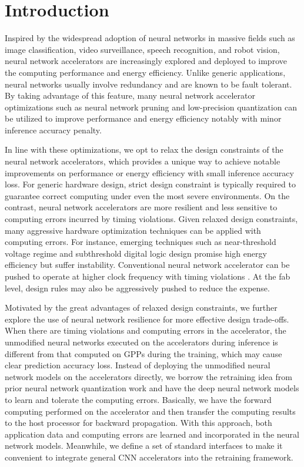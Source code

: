 \section{Introduction} \label{sec:intro}
Inspired by the widespread adoption of neural networks in massive fields such as image classification, 
video surveillance, speech recognition, and robot vision, neural network accelerators 
\cite{pipecnn_2,Zhang2015_9,Qiu2016_10,deepburing_12,Farabet2010_13,Zeng2018_18} 
are increasingly explored and deployed to improve the computing performance and energy efficiency.
Unlike generic applications, neural networks usually involve redundancy and are known to be 
fault tolerant\cite{Reagen2016}. By taking advantage of this feature, many neural network accelerator optimizations 
such as neural network pruning and low-precision quantization can be utilized to improve 
performance and energy efficiency notably with minor inference accuracy penalty\cite{Han2016DeepCC}. 

In line with these optimizations, we opt to relax the design constraints of 
the neural network accelerators, which provides a unique way to achieve notable 
improvements on performance or energy efficiency with small inference accuracy loss. 
For generic hardware design, strict design constraint is typically required to 
guarantee correct computing under even the most severe environments. On the contrast, 
neural network accelerators are more resilient and less sensitive to computing 
errors incurred by timing violations. Given relaxed design constraints, many 
aggressive hardware optimization techniques can be applied with computing errors. 
For instance, emerging techniques such as  near-threshold voltage regime\cite{RG2010NT} 
and subthreshold digital logic design\cite{BH2005,B2006} promise high energy efficiency 
but suffer instability. Conventional neural network accelerator 
can be pushed to operate at higher clock frequency with timing violations
\cite{overclock_3,Paceline_15}. At the fab level, design rules may also 
be aggressively pushed to reduce the expense. 

Motivated by the great advantages of relaxed design constraints,
we further explore the use of neural network resilience for more 
effective design trade-offs. When there are timing violations
and computing errors in the accelerator, the unmodified neural networks 
executed on the accelerators during inference is different 
from that computed on GPPs during the training, which may cause clear 
prediction accuracy loss. Instead of deploying the unmodified neural 
network models on the accelerators directly, we borrow the retraining 
idea from prior neural network quantization work \cite{Hwang2014_17,Matthieu2014_8} 
and have the deep neural network models to learn and tolerate the computing errors.  
Basically, we have the forward computing performed on the accelerator and 
then transfer the computing results to the host processor for 
backward propagation. With this approach, both application data and computing 
errors are learned and incorporated in the neural network models.  
Meanwhile, we define a set of standard interfaces to make it convenient 
to integrate general CNN accelerators into the retraining framework. 

